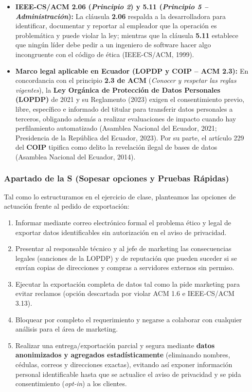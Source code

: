 \documentclass[12pt,a4paper,oneside]{article}
\begin{document}
\begin{itemize}[leftmargin=1.8em,itemsep=4pt]
    \item \textbf{IEEE-CS/ACM 2.06 (\textit{Principio 2}) y 5.11 (\textit{Principio 5 -- Administración}):} La cláusula \textbf{2.06} respalda a la desarrolladora para identificar, documentar y reportar al empleador que la operación es problemática y puede violar la ley; mientras que la cláusula \textbf{5.11} establece que ningún líder debe pedir a un ingeniero de software hacer algo incongruente con el código de ética (IEEE-CS/ACM, 1999).
    \item \textbf{Marco legal aplicable en Ecuador (LOPDP y COIP -- ACM 2.3):} En concordancia con el principio \textbf{2.3 de ACM} (\textit{Conocer y respetar las reglas vigentes}), la \textbf{Ley Orgánica de Protección de Datos Personales (LOPDP)} de 2021 y su Reglamento (2023) exigen el consentimiento previo, libre, específico e informado del titular para transferir datos personales a terceros, obligando además a realizar evaluaciones de impacto cuando hay perfilamiento automatizado (Asamblea Nacional del Ecuador, 2021; Presidencia de la República del Ecuador, 2023). Por su parte, el artículo 229 del \textbf{COIP} tipifica como delito la revelación ilegal de bases de datos (Asamblea Nacional del Ecuador, 2014).
\end{itemize}

\subsubsection{Apartado de la S (Sopesar opciones y Pruebas Rápidas)}
Tal como lo estructuramos en el ejercicio de clase, planteamos las opciones de actuación frente al pedido de exportación:

\begin{enumerate}[leftmargin=1.8em,itemsep=3pt]
    \item Informar mediante correo electrónico formal el problema ético y legal de exportar datos identificables sin autorización en el aviso de privacidad.
    \item Presentar al responsable técnico y al jefe de marketing las consecuencias legales (sanciones de la LOPDP) y de reputación que pueden suceder si se envían copias de direcciones y compras a servidores externos sin permiso.
    \item Ejecutar la exportación completa de datos tal como la pide marketing para evitar reclamos (opción descartada por violar ACM 1.6 e IEEE-CS/ACM 3.13).
    \item Bloquear por completo el requerimiento y negarse a colaborar con cualquier análisis para el área de marketing.
    \item Realizar una entrega/exportación parcial y segura mediante \textbf{datos anonimizados y agregados estadísticamente} (eliminando nombres, cédulas, correos y direcciones exactas), evitando así exponer información personal identificable hasta que se actualice el aviso de privacidad y se pida consentimiento (\textit{opt-in}) a los clientes.
\end{enumerate}
\end{document}
